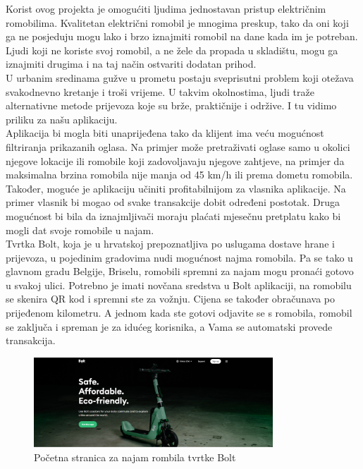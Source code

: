 		\indent Korist ovog projekta je omogućiti ljudima jednostavan pristup električnim romobilima. Kvalitetan električni romobil je mnogima preskup, tako da oni koji ga ne posjeduju mogu lako i brzo iznajmiti romobil na dane kada im je potreban. Ljudi koji ne koriste svoj romobil, a ne žele da propada u skladištu, mogu ga iznajmiti drugima i na taj način ostvariti dodatan prihod. \\
		\indent U urbanim sredinama gužve u prometu postaju sveprisutni problem koji otežava svakodnevno kretanje i troši vrijeme. U takvim okolnostima, ljudi traže alternativne metode prijevoza koje su brže, praktičnije i održive. I tu vidimo priliku za našu aplikaciju.\\
		
		\indent Aplikacija bi mogla biti unaprijeđena tako da klijent ima veću mogućnost filtriranja prikazanih oglasa. Na primjer može pretraživati oglase samo u okolici njegove lokacije ili romobile koji zadovoljavaju njegove zahtjeve, na primjer da maksimalna brzina romobila nije manja od 45 km/h ili prema dometu romobila. Također, moguće je aplikaciju učiniti profitabilnijom za vlasnika aplikacije.
		Na primer vlasnik bi mogao od svake transakcije dobit određeni postotak. Druga mogućnost bi bila da iznajmljivači moraju plaćati mjesečnu pretplatu kako bi mogli dat svoje romobile u najam. \\
		
		\indent Tvrtka Bolt, koja je u hrvatskoj prepoznatljiva po uslugama dostave hrane i prijevoza, u pojedinim gradovima nudi mogućnost najma romobila. Pa se tako u glavnom gradu Belgije, Briselu, romobili spremni za najam mogu pronaći gotovo u svakoj ulici. Potrebno je imati novčana sredstva u Bolt aplikaciji, na romobilu se skenira QR kod i spremni ste za vožnju. Cijena se također obračunava po prijeđenom kilometru. A jednom kada ste gotovi odjavite se s romobila, romobil se zaključa i spreman je za idućeg korisnika, a Vama se 	automatski provede transakcija.
		
		
		\begin{figure}[h]
			\centering
			\includegraphics[width=0.8\textwidth]{slike/bolt-1.png}
			\caption{Početna stranica za najam rombila tvrtke Bolt}
			\label{fig:bolt-1}
		\end{figure}
		

